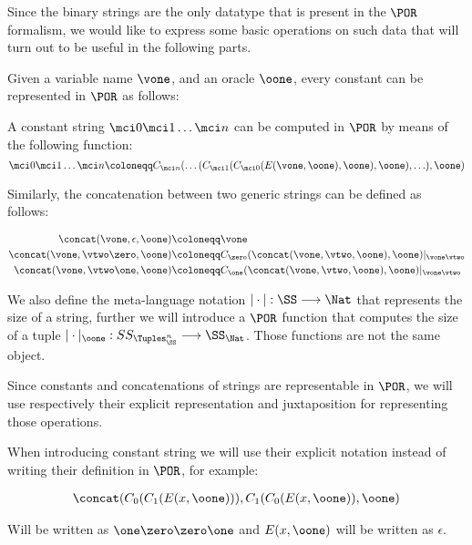 Since the binary strings are the only datatype that is present in the $\POR$ formalism, we would like to express some basic operations on such data that will turn out to be useful in the following parts.

Given a variable name $\vone$, and an oracle $\oone$, every constant can be represented in $\POR$ as follows:

\begin{defn}
A constant string $\mci 0\mci1\ldots\mci n$ can be computed in $\POR$ by means of the following function:
\[
\mci 0\mci1\ldots\mci n \coloneqq C_{\mci n}(\ldots(C_{\mci1}(C_{\mci0}(E(\vone, \oone), \oone), \oone), \ldots), \oone)
\]
\end{defn}

Similarly, the concatenation between two generic strings can be defined as follows:

\begin{defn}
\begin{align*}
\concat(\vone, \epsilon, \oone) &\coloneqq \vone\\
\concat(\vone, \vtwo \zero, \oone) &\coloneqq C_\zero (\concat(\vone,\vtwo, \oone), \oone)|_{\vone\vtwo}\\
\concat(\vone, \vtwo \one, \oone) &\coloneqq C_\one (\concat(\vone,\vtwo, \oone), \oone)|_{\vone\vtwo}\\
\end{align*}
\end{defn}

We also define the meta-language notation $|\cdot|: \SS \longrightarrow \Nat $ that represents the size of a string, further we will introduce a $\POR$ function that computes the size of a tuple $|\cdot|_\oone: SS_{\Tuples_\SS^n}\longrightarrow \SS_\Nat$. Those functions are not the same object.

Since constants and concatenations of strings are representable in $\POR$, we will use respectively their explicit representation and juxtaposition for representing those operations.

\begin{notation}
When introducing constant string we will use their explicit notation instead of writing their definition in $\POR$, for example:

\begin{align*}
\concat(C_0(C_1(E(x, \oone))), C_1(C_0(E(x, \oone)), \oone)
\end{align*}

Will be written as $\one \zero\zero\one$ and $E(x, \oone)$ will be written as $\epsilon$.
\end{notation}

